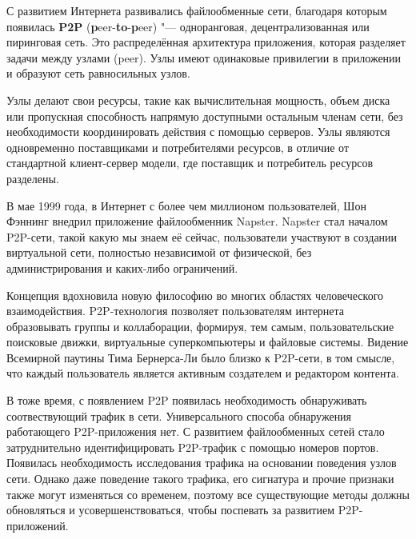 \documentclass[bachelor, och, coursework]{SCWorks}
\begin{document}




\tableofcontents

\intro
С развитием Интернета развивались файлообменные сети, благодаря которым появилась \textbf{P2P} (\textbf{p}eer-\textbf{to}-\textbf{p}eer) "--- одноранговая, децентрализованная или пиринговая сеть. Это распределённая архитектура приложения, которая разделяет задачи между узлами (peer). Узлы имеют одинаковые привилегии в приложении и образуют сеть равносильных узлов.

Узлы делают свои ресурсы, такие как вычислительная мощность, объем диска или пропускная способность напрямую доступными остальным членам сети, без необходимости координировать действия с помощью серверов. Узлы являются одновременно поставщиками и потребителями ресурсов, в отличие от стандартной клиент-сервер модели, где поставщик и потребитель ресурсов разделены. \cite{P2P_1}

В мае 1999 года, в Интернет с более чем миллионом пользователей, Шон Фэннинг внедрил приложение файлообменник Napster. 
Napster стал началом P2P-сети, такой какую мы знаем её сейчас, пользователи участвуют в создании виртуальной сети, 
полностью независимой от физической, без администрирования и каких-либо ограничений.

Концепция вдохновила новую философию во многих областях человеческого взаимодействия. 
P2P-технология позволяет пользователям интернета образовывать группы и коллаборации, формируя, тем самым, пользовательские поисковые движки, виртуальные суперкомпьютеры и файловые системы. 
Видение Всемирной паутины Тима Бернерса-Ли было близко к P2P-сети, в том смысле, 
что каждый пользователь является активным создателем и редактором контента.

В тоже время, с появлением P2P появилась необходимость обнаруживать соотвествующий трафик в сети.
Универсального способа обнаружения работающего P2P-приложения нет. С развитием файлообменных сетей стало затруднительно
идентифицировать P2P-трафик с помощью номеров портов. Появилась необходимость исследования трафика на основании поведения узлов сети. Однако даже поведение такого трафика, его сигнатура и прочие признаки также могут изменяться со временем, поэтому все существующие методы должны обновляться и усовершенствоваться, чтобы поспевать за развитием P2P-приложений.
\end{document}
